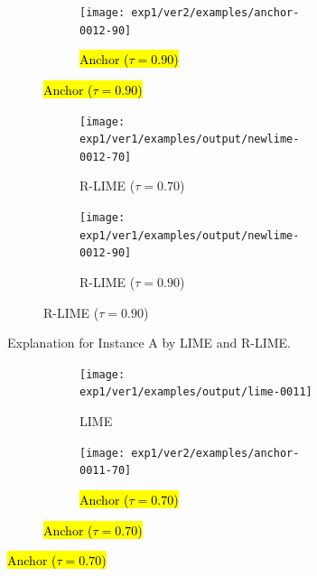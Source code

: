 \documentclass[runningheads]{llncs}
\begin{document}
{{\begin{figure}[t]
\begin{subfigure}[t]{0.45\textwidth}
        \vspace{10pt}
        \begin{subfigure}[t]{\textwidth}
          \centering
          \texttt{[image: exp1/ver2/examples/anchor-0012-90]}  %
          \caption{\hl{Anchor ($\tau=0.90$)}}
          \vspace{1.0em}
        \end{subfigure}
      \end{subfigure}
      \hfill
      \begin{subfigure}[t]{0.45\textwidth}
        \begin{subfigure}[t]{\textwidth}
          \hspace{-5pt}
          \texttt{[image: exp1/ver1/examples/output/newlime-0012-70]}  %
          \caption{R-LIME ($\tau=0.70$)}\label{fig:rlime-0-70}
        \end{subfigure}
        \begin{subfigure}[t]{\textwidth}
          \hspace{-17pt}
          \texttt{[image: exp1/ver1/examples/output/newlime-0012-90]}  %
          \caption{R-LIME ($\tau=0.90$)}
        \end{subfigure}
      \end{subfigure}
      \caption[Explanation for Instance A by LIME and R-LIME]{%
        Explanation for Instance A by LIME and R-LIME\@.
      }\label{fig:A}
    \end{figure}
    \begin{figure}[t]
      \begin{subfigure}[t]{0.45\textwidth}
        \begin{subfigure}[t]{\textwidth}
          \hspace{-26.5pt}
          \texttt{[image: exp1/ver1/examples/output/lime-0011]}
          \caption{LIME}\label{fig:lime-1}
          \vspace{1.0em}
        \end{subfigure}

        \vspace{10pt}
        \begin{subfigure}[t]{\textwidth}
          \centering
          \texttt{[image: exp1/ver2/examples/anchor-0011-70]}  %
          \caption{\hl{Anchor ($\tau=0.70$)}}
          \vspace{1.0em}
        \end{subfigure}


\end{subfigure}
\end{figure}}}
\end{document}
